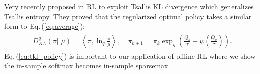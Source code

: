 \documentclass{article}
\newcommand{\AdaBracket}[1]{\left(#1\right)}
\newcommand{\AdaAngleProduct}[2]{\left\langle#1, #2\right\rangle}
\newcommand{\qKLany}[2]{D^{q}_{\!K\!L}\!\left(#1 \left|  \right| #2 \right)}
\newcommand{\logq}[1]{\ln_{q}\!#1}
\newcommand{\eq}[1]{Eq.\,(#1)}
\begin{document}
Very recently \citet{zhu2023generalized} proposed in RL to exploit Tsallis KL divergence which generalizes Tsallis entropy.  
They proved that the regularized optimal policy takes a similar form to \eq{\ref{eq:average}}:
\begin{align}
    \begin{split}
        \qKLany{\pi}{\mu} = \AdaAngleProduct{\pi}{\logq{\frac{\pi}{\mu}}}, \quad \pi_{k+1} = \pi_{k} \exp_q\AdaBracket{\frac{Q_k}{\tau} - \psi\AdaBracket{\frac{Q_k}{\tau}} }.
    \end{split}
    \label{eq:tkl_policy}
\end{align}
\eq{\ref{eq:tkl_policy}} is important to our application of offline RL where we show the in-sample softmax becomes in-sample sparsemax.
\end{document}
